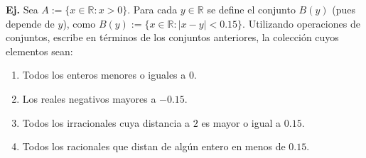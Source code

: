 \documentclass[letterpaper,DIV=14,headsepline,12pt]{scrartcl}
\newcounter{Ejer}
\newcommand{\pts}{}
\newenvironment{ejercicio}[1]{\noindent
    \ifthenelse{\equal{#1}{1}}{\renewcommand{\pts}{\textbf{(#1 pt)}}}{\renewcommand{\pts}{\textbf{(#1 pts)}}}\textbf{Ej. \theEjer} \pts\stepcounter{Ejer}}{\vspace{.3cm}}
\begin{document}
    





    \newpage
    \begin{ejercicio}{1}
        Sea $A:=\{x \in \mathbb{R} : \text{$x > 0$} \}$. Para cada $y \in \mathbb{R}$ se define el conjunto $B(y)$ (pues depende de $y$), como $B(y):=\{x \in \mathbb{R} : |x-y|<0.15 \}$. Utilizando operaciones de conjuntos, escribe en términos de los conjuntos anteriores, la colección cuyos elementos sean:
        \begin{enumerate}
            \item Todos los enteros menores o iguales a $0$.
            \item Los reales negativos mayores a $-0.15$.
            \item Todos los irracionales cuya distancia a $2$ es mayor o igual a $0.15$.
            \item Todos los racionales que distan de algún entero en menos de $0.15$.
        \end{enumerate}
    \end{ejercicio}
\end{document}
